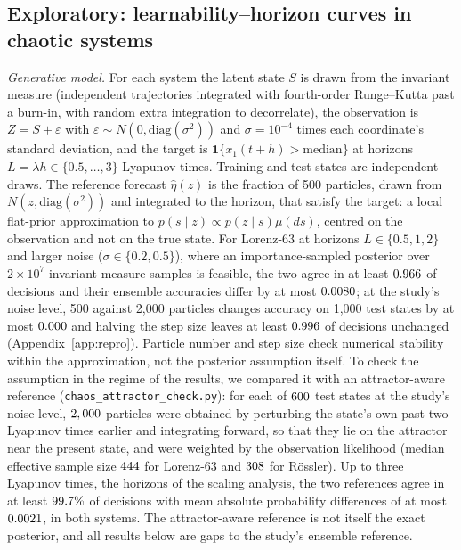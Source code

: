 \documentclass[journal]{IEEEtran}
\theoremstyle{definition}
\newcommand{\ind}{\mathbf{1}}
\begin{document}
\subsection{Exploratory: learnability--horizon curves in chaotic systems}\label{sec:chaos}
\emph{Generative model.} For each system the latent state $S$ is drawn from the invariant measure (independent trajectories integrated with fourth-order Runge--Kutta past a burn-in, with random extra integration to decorrelate), the observation is $Z=S+\varepsilon$ with $\varepsilon\sim N(0,\mathrm{diag}(\sigma^2))$ and $\sigma=10^{-4}$ times each coordinate's standard deviation, and the target is $\ind\{x_1(t+h)>\mathrm{median}\}$ at horizons $L=\lambda h\in\{0.5,\ldots,3\}$ Lyapunov times. Training and test states are independent draws. The reference forecast $\hat\eta(z)$ is the fraction of 500 particles, drawn from $N(z,\mathrm{diag}(\sigma^2))$ and integrated to the horizon, that satisfy the target: a local flat-prior approximation to $p(s\mid z)\propto p(z\mid s)\mu(ds)$, centred on the observation and not on the true state. For Lorenz-63 at horizons $L\in\{0.5,1,2\}$ and larger noise ($\sigma\in\{0.2,0.5\}$), where an importance-sampled posterior over $2\times10^7$ invariant-measure samples is feasible, the two agree in at least $0.966$ of decisions and their ensemble accuracies differ by at most $0.0080$; at the study's noise level, 500 against 2{,}000 particles changes accuracy on 1{,}000 test states by at most $0.000$ and halving the step size leaves at least $0.996$ of decisions unchanged (Appendix~\ref{app:repro}). Particle number and step size check numerical stability within the approximation, not the posterior assumption itself. To check the assumption in the regime of the results, we compared it with an attractor-aware reference (\texttt{chaos\_attractor\_check.py}): for each of $600$ test states at the study's noise level, $2,000$ particles were obtained by perturbing the state's own past two Lyapunov times earlier and integrating forward, so that they lie on the attractor near the present state, and were weighted by the observation likelihood (median effective sample size $444$ for Lorenz-63 and $308$ for R\"ossler). Up to three Lyapunov times, the horizons of the scaling analysis, the two references agree in at least $99.7\%$ of decisions with mean absolute probability differences of at most $0.0021$, in both systems. The attractor-aware reference is not itself the exact posterior, and all results below are gaps to the study's ensemble reference.
\end{document}
